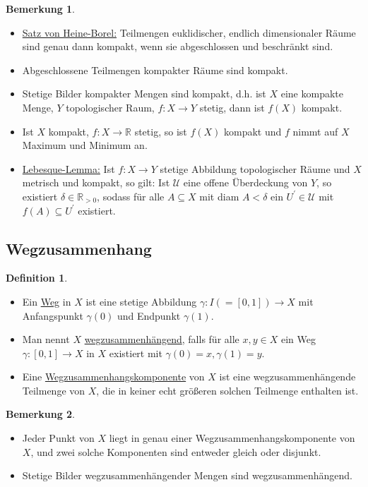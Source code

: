 \documentclass[a4paper,11pt,notitlepage]{report}
\theoremstyle{definition}
\newtheorem{definition}{Definition}[chapter]
\newtheorem{remark}{Bemerkung}[chapter]
\newcommand{\R}{{\ensuremath{\mathbb{R}}}}
\begin{document}
\begin{remark}
	\begin{itemize}
		\item \underline{Satz von Heine-Borel:} Teilmengen euklidischer, endlich dimensionaler Räume sind genau dann kompakt, wenn sie abgeschlossen und beschränkt sind.
		\item Abgeschlossene Teilmengen kompakter Räume sind kompakt.
		\item Stetige Bilder kompakter Mengen sind kompakt, d.h. ist $X$ eine kompakte Menge, $Y$ topologischer Raum, $f \colon X \rightarrow Y$ stetig, dann ist $f(X)$ kompakt.
		\item Ist $X$ kompakt, $f \colon X \rightarrow \R$ stetig, so ist $f(X)$ kompakt und $f$ nimmt auf $X$ Maximum und Minimum an.
		\item \underline{Lebesque-Lemma:} Ist $f \colon X \rightarrow Y$ stetige Abbildung topologischer Räume und $X$ metrisch und kompakt, so gilt:
		\newline
			Ist $\mathcal{U}$ eine offene Überdeckung von $Y$, so existiert $\delta \in \R_{>0}$, sodass für alle $A \subseteq X$ mit diam $A < \delta$ ein $U^\prime \in \mathcal{U}$ mit $f(A) \subseteq U^\prime$ existiert.
	\end{itemize}
\end{remark}

\subsection{Wegzusammenhang}
\begin{definition}
	\begin{itemize}
		\item Ein \underline{Weg} in $X$ ist eine stetige Abbildung $\gamma \colon I(=[0,1]) \rightarrow X$ mit Anfangspunkt $\gamma(0)$ und Endpunkt $\gamma(1)$.	
		\item Man nennt $X$ \underline{wegzusammenhängend}, falls für alle $x,y \in X$ ein Weg $\gamma \colon [0,1] \rightarrow X$ in $X$ existiert mit $\gamma(0)=x, \gamma(1)=y$.
		\item Eine \underline{Wegzusammenhangskomponente} von $X$ ist eine wegzusammenhängende Teilmenge von $X$, die in keiner echt größeren solchen Teilmenge enthalten ist.
	\end{itemize}
\end{definition}

\begin{remark}
	\begin{itemize}
		\item Jeder Punkt von $X$ liegt in genau einer Wegzusammenhangskomponente von $X$, und zwei solche Komponenten sind entweder gleich oder disjunkt.
		\item Stetige Bilder wegzusammenhängender Mengen sind wegzusammenhängend.
	\end{itemize}
\end{remark}
\end{document}

